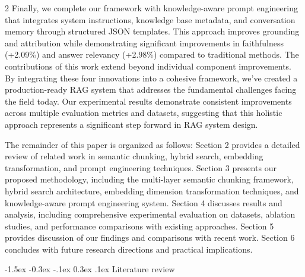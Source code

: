 \documentclass[10pt,letterpaper]{article}
\makeatletter
\renewcommand{\section}{\@startsection{section}{1}{\z@}%
                                   {-1.5ex \@plus -0.3ex \@minus -.1ex}%
                                   {0.3ex \@plus.1ex}%
                                   {\normalfont\large\bfseries}}
\makeatother
\begin{document}
\begin{multicols}{2}
Finally, we complete our framework with knowledge-aware prompt engineering that integrates system instructions, knowledge base metadata, and conversation memory through structured JSON templates. This approach improves grounding and attribution while demonstrating significant improvements in faithfulness (+2.09\%) and answer relevancy (+2.98\%) compared to traditional methods. The contributions of this work extend beyond individual component improvements. By integrating these four innovations into a cohesive framework, we've created a production-ready RAG system that addresses the fundamental challenges facing the field today. Our experimental results demonstrate consistent improvements across multiple evaluation metrics and datasets, suggesting that this holistic approach represents a significant step forward in RAG system design.

The remainder of this paper is organized as follows: Section 2 provides a detailed review of related work in semantic chunking, hybrid search, embedding transformation, and prompt engineering techniques. Section 3 presents our proposed methodology, including the multi-layer semantic chunking framework, hybrid search architecture, embedding dimension transformation techniques, and knowledge-aware prompt engineering system. Section 4 discusses results and analysis, including comprehensive experimental evaluation on datasets, ablation studies, and performance comparisons with existing approaches. Section 5 provides discussion of our findings and comparisons with recent work. Section 6 concludes with future research directions and practical implications.


\section{Literature review}

\vspace{0.5em}

\end{multicols}
\end{document}
